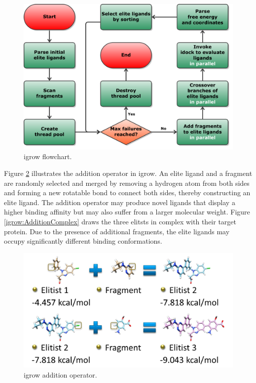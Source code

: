 \documentclass[10pt, conference, compsocconf]{IEEEtran}
\begin{document}
\begin{figure}
\centering
\includegraphics[width=\textwidth]{../igrow/Flowchart.pdf}
\caption{igrow flowchart.}
\label{igrow:Flowchart}
\end{figure}

Figure \ref{igrow:Addition} illustrates the addition operator in igrow. An elite ligand and a fragment are randomly selected and merged by removing a hydrogen atom from both sides and forming a new rotatable bond to connect both sides, thereby constructing an elite ligand. The addition operator may produce novel ligands that display a higher binding affinity but may also suffer from a larger molecular weight. Figure \ref{igrow:AdditionComplex} draws the three elitsts in complex with their target protein. Due to the presence of additional fragments, the elite ligands may occupy significantly different binding conformations.

\begin{figure}
\centering
\includegraphics[width=\textwidth]{../igrow/Addition.png}
\caption{igrow addition operator.}
\label{igrow:Addition}
\end{figure}
\end{document}
